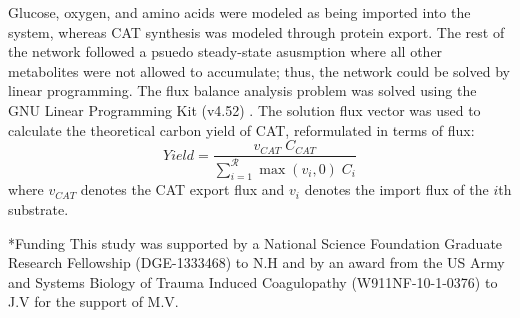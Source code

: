 \documentclass[12pt]{article}
\makeatletter
\renewcommand\section{\@startsection
	{subsection}{2}{0mm}
	{-0.2in}
	{0.05\baselineskip}
	{\normalfont\large\bfseries}}
\makeatother
\begin{document}
Glucose, oxygen, and amino acids were modeled as being imported into the system, whereas CAT synthesis was modeled through protein export.
The rest of the network followed a psuedo steady-state asusmption where all other metabolites were not allowed to accumulate; thus, the network could be solved by linear programming.
The flux balance analysis problem was solved using the GNU Linear Programming Kit (v4.52) \cite{GLPK}.
The solution flux vector was used to calculate the theoretical carbon yield of CAT, reformulated in terms of flux:
\begin{equation}\label{eqn:yield}
	Yield=\frac{v_{CAT}\;C_{CAT}}{\sum_{i=1}^{\mathcal{R}}\max(v_{i},0)\;C_{i}}
\end{equation}
where $v_{CAT}$ denotes the CAT export flux and $v_{i}$ denotes the import flux of the $i$th substrate.

\clearpage


\section*{Funding}
This study was supported by a National Science Foundation Graduate Research Fellowship (DGE-1333468) to N.H and by an award from
the US Army and Systems Biology of Trauma Induced Coagulopathy (W911NF-10-1-0376) to J.V for the support of M.V.

\clearpage



\clearpage
\end{document}
